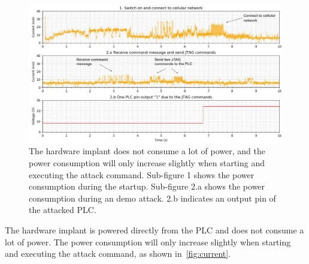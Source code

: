 \begin{figure}[h]
	\includegraphics[width=\textwidth]{figures/current}
	\centering
	\caption{The hardware implant does not consume a lot of power, and the power consumption will only increase slightly when starting and executing the attack command. Sub-figure 1 shows the power consumption during the startup. Sub-figure 2.a shows the power consumption during an demo attack. 2.b indicates an output pin of the attacked PLC. }
	\label{fig:current}
\end{figure}

The hardware implant is powered directly from the PLC and does not consume a lot of power. The power consumption will only increase slightly when starting and executing the attack command, as shown in~\autoref{fig:current}.

